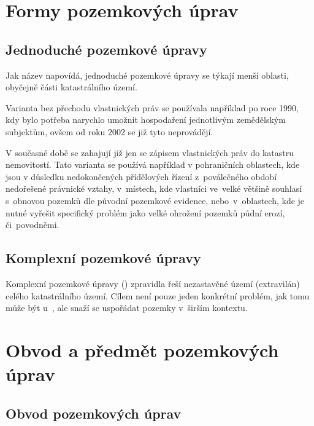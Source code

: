 \section{Formy pozemkových úprav}
\label{formy_pu}

\subsection{Jednoduché pozemkové úpravy}
\label{jednoduche_pu}

Jak název napovídá, jednoduché pozemkové úpravy se týkají menší oblasti, obyčejně části katastrálního území.

Varianta  bez přechodu vlastnických práv se používala například po roce 1990, kdy bylo potřeba narychlo umožnit hospodaření jednotlivým zemědělským subjektům, ovšem od roku 2002 se již tyto  neprovádějí.

V současné době se zahajují již jen  se zápisem vlastnických práv do katastru nemovitostí. Tato varianta  se používá například v pohraničních oblastech, kde jsou v důsledku nedokončených přídělových řízení z~poválečného období nedořešené právnické vztahy, v~místech, kde vlastníci ve~velké většině souhlasí s~obnovou pozemků dle původní pozemkové evidence, nebo~v~oblastech, kde je nutné vyřešit specifický problém jako velké ohrožení pozemků půdní erozí, či~povodněmi.

\subsection{Komplexní pozemkové úpravy}
\label{komplexní_pu}

Komplexní pozemkové úpravy () zpravidla řeší nezastavěné území (extravilán) celého katastrálního území. Cílem  není pouze jeden konkrétní problém, jak tomu může být u~, ale snaží se uspořádat pozemky v~širším kontextu. 

\section{Obvod a předmět pozemkových úprav}
\label{obvod_a_predmet_pu}

\subsection{Obvod pozemkových úprav}
\label{obvod_pu}

